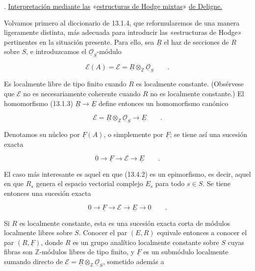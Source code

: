 \par\medskip
{}. \underline{Interpretación mediante las} «\underline{estructuras de Hodge
mixtas}» \underline{de Deligne.}

Volvamos primero al diccionario de 13.1.4, que reformularemos de una
manera ligeramente distinta, más adecuada para introducir las
«estructuras de Hodge» pertinentes en la situación presente. Para ello,
sea $\underline R$ el haz de secciones de $R$ sobre $S$, e introduzcamos
el $\underline{\mathcal O}_S$-módulo

\begin{equation}\tag{13.4.1}
 \mathcal E(A)=\mathcal E=
 \underline R\otimes_{\mathbb Z}\underline{\mathcal O}_S\qquad .
\end{equation}

\noindent
Es localmente libre de tipo finito cuando $R$ es localmente constante.
(Obsérvese que $\mathcal E$ no es necesariamente coherente cuando $R$
no es localmente constante.) El homomorfismo (13.1.3)
$\underline R\longrightarrow\underline E$ define entonces un
homomorfismo canónico

\begin{equation}\tag{13.4.2}
 \mathcal E=\underline R\otimes_{\mathbb Z}
 \underline{\mathcal O}_S\longrightarrow\underline E\qquad .
\end{equation}

\noindent
Denotamos su núcleo por $\underline F(A)$, o simplemente por
$\underline F$; se tiene así una sucesión exacta

\begin{equation}\tag{13.4.3}
 0\longrightarrow\underline F\longrightarrow\mathcal E
 \longrightarrow\underline E\qquad .
\end{equation}

\noindent
El caso más interesante es aquel en que (13.4.2) es un epimorfismo, es
decir, aquel en que $R_s$ genera el espacio vectorial complejo $E_s$
para todo $s\in S$. Se tiene entonces una sucesión exacta

\begin{equation}\tag{13.4.4}
 0\longrightarrow\underline F\longrightarrow\mathcal E
 \longrightarrow\underline E\longrightarrow0\qquad .
\end{equation}

\noindent
Si $R$ es localmente constante, esta es una sucesión exacta corta de
módulos localmente libres sobre $S$. Conocer el par $(E,R)$ equivale
entonces a conocer el par $(R,\underline F)$, donde $R$ es un grupo
analítico localmente constante sobre $S$ cuyas fibras son
$\mathbb Z$-módulos libres de tipo finito, y $\underline F$ es un
submódulo localmente sumando directo de
$\mathcal E=\underline R\otimes_{\mathbb Z}
\underline{\mathcal O}_S$, sometido además a

